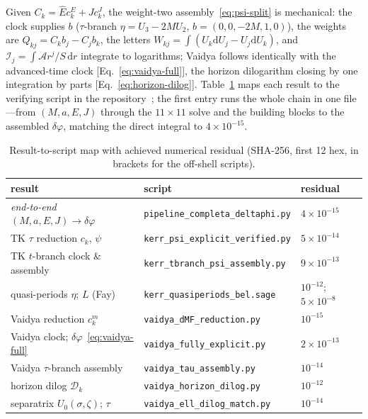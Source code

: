 \documentclass[
    aps, prd, twocolumn, superscriptaddress,
    showpacs, nofootinbib, floatfix
]{revtex4-2}
\newcommand{\Ehat}{\hat E}
\newcommand{\dd}{\mathrm{d}}
\begin{document}
Given $C_k=\Ehat c_k^{E}+J c_k^{J}$, the weight-two assembly~\eqref{eq:psi-split} is
mechanical: the clock supplies $b$ ($\tau$-branch $\eta=U_3-2M U_2$,
$b=(0,0,-2M,1,0)$), the weights are $Q_{kj}=C_kb_j-C_jb_k$, the letters
$W_{kj}=\int(U_k\dd U_j-U_j\dd U_k)$, and
$\mathcal{I}_j=\int\mathcal{A}r^j/S\,\dd r$ integrate to logarithms; Vaidya follows
identically with the advanced-time clock [Eq.~\eqref{eq:vaidya-full}], the horizon
dilogarithm closing by one integration by parts [Eq.~\eqref{eq:horizon-dilog}].
Table~\ref{tab:script-map} maps each result to the verifying script in the
repository~\cite{Rosignoli2026Code}; the first entry runs the whole chain in one
file---from $(M,a,E,J)$ through the $11\times11$ solve and the building blocks to the
assembled $\delta\varphi$, matching the direct integral to $4\times10^{-15}$.
\begin{table}[t]
    \centering
    \footnotesize
    \caption{Result-to-script map with achieved numerical residual (SHA-256, first 12
    hex, in brackets for the off-shell scripts).}
    \label{tab:script-map}
    \begin{ruledtabular}
    \begin{tabular}{lll}
        result & script & residual\\
        \hline
        \emph{end-to-end} $(M,a,E,J)\!\to\!\delta\varphi$ & \texttt{pipeline\_completa\_deltaphi.py} & $4{\times}10^{-15}$\\
        TK $\tau$ reduction $c_k$, $\psi$ & \texttt{kerr\_psi\_explicit\_verified.py} & $5{\times}10^{-14}$\\
        TK $t$-branch clock \& assembly & \texttt{kerr\_tbranch\_psi\_assembly.py} & $9{\times}10^{-13}$\\
        quasi-periods $\eta$; $L$ (Fay) & \texttt{kerr\_quasiperiods\_bel.sage} & $10^{-12}$; $5{\times}10^{-8}$\\
        Vaidya reduction $c_k^m$ & \texttt{vaidya\_dMF\_reduction.py} & $10^{-15}$\\
        Vaidya clock; $\delta\varphi$~\eqref{eq:vaidya-full} & \texttt{vaidya\_fully\_explicit.py} & $2{\times}10^{-13}$\\
        Vaidya $\tau$-branch assembly & \texttt{vaidya\_tau\_assembly.py} & $10^{-14}$\\
        horizon dilog $\mathcal{D}_k$ & \texttt{vaidya\_horizon\_dilog.py} & $10^{-12}$\\
        separatrix $U_0(\sigma,\zeta)$; $\tau$ & \texttt{vaidya\_ell\_dilog\_match.py} & $10^{-14}$\\

\end{tabular}
\end{ruledtabular}
\end{table}
\end{document}
